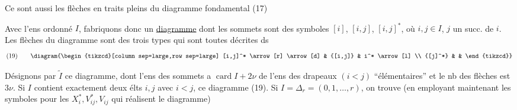 
Ce sont aussi les  flèches en traits pleins du diagramme fondamental (17)

Avec l'ens ordonné $I$, fabriquons donc un  \uline{diagramme} dont les sommets sont  des symboles  $[i]$, $[i,j]$, $[i,j]^*$, où $i,j\in I$, $j$ un succ. de $i$. Les flèches du diagramme sont des trois types qui sont toutes décrites ds
\[
(19)\qquad
\diagram{\begin{tikzcd}[column sep=large,row sep=large]
[i,j]^* \arrow[r] \arrow[d] & {[i,j]} & i^* \arrow[l] \\
{[j]^*} & &
\end{tikzcd}}
\]

Désignons par $\widetilde I$ ce diagramme, dont l'ens des sommets  a   $\operatorname{card}I+2\nu$   de l'ens des drapeaux $(i<j)$ ``élémentaires''  et le nb des flèches est $3\nu$. Si $I$ contient exactement deux élts $i,j$ avec $i<j$,  ce diagramme  (19). Si $I=\Delta_r=(0,1,\ldots,r)$, on trouve (en employant maintenant les symboles pour les $X_i^*,V_{ij}^*,V_{ij}$ qui réalisent le diagramme)

